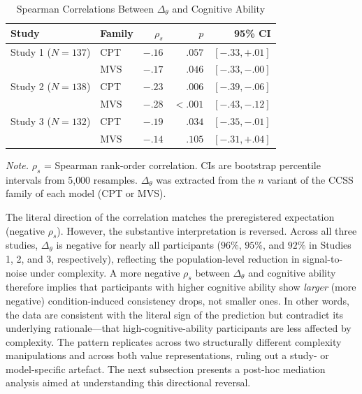 \documentclass[man,floatsintext]{apa7}
\begin{document}
\begin{table}[!htbp]
\centering
\begin{threeparttable}
\caption{Spearman Correlations Between $\Delta_\theta$ and Cognitive Ability}
\label{tab:ca_dtheta}
\begin{tabular}{llrrr}
\toprule
\textbf{Study} & \textbf{Family} & $\rho_s$ & $p$ & \textbf{95\% CI} \\
\midrule
Study 1 ($N = 137$) & CPT  & $-.16$ & $.057$  & $[-.33, +.01]$ \\
                    & MVS  & $-.17$ & $.046$  & $[-.33, -.00]$ \\
Study 2 ($N = 138$) & CPT  & $-.23$ & $.006$  & $[-.39, -.06]$ \\
                    & MVS  & $-.28$ & $< .001$ & $[-.43, -.12]$ \\
Study 3 ($N = 132$) & CPT  & $-.19$ & $.034$  & $[-.35, -.01]$ \\
                    & MVS  & $-.14$ & $.105$  & $[-.31, +.04]$ \\
\bottomrule
\end{tabular}
\begin{tablenotes}[flushleft]
\small
\item \textit{Note.} $\rho_s$ = Spearman rank-order correlation. CIs are bootstrap percentile intervals from 5{,}000 resamples. $\Delta_\theta$ was extracted from the $n$ variant of the CCSS family of each model (CPT or MVS).
\end{tablenotes}
\end{threeparttable}
\end{table}

The literal direction of the correlation matches the preregistered expectation (negative $\rho_s$). However, the substantive interpretation is reversed. Across all three studies, $\Delta_\theta$ is negative for nearly all participants ($96\%$, $95\%$, and $92\%$ in Studies 1, 2, and 3, respectively), reflecting the population-level reduction in signal-to-noise under complexity. A more negative $\rho_s$ between $\Delta_\theta$ and cognitive ability therefore implies that participants with higher cognitive ability show \textit{larger} (more negative) condition-induced consistency drops, not smaller ones. In other words, the data are consistent with the literal sign of the prediction but contradict its underlying rationale---that high-cognitive-ability participants are less affected by complexity. The pattern replicates across two structurally different complexity manipulations and across both value representations, ruling out a study- or model-specific artefact. The next subsection presents a post-hoc mediation analysis aimed at understanding this directional reversal.
\end{document}
